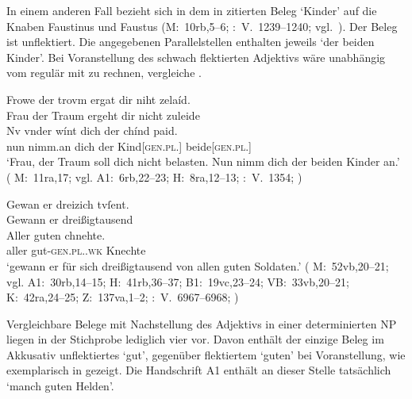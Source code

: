 In einem anderen Fall bezieht sich in dem in  zitierten
Beleg  `Kinder' auf die Knaben Faustinus und Faustus (M:~10rb,5--6;
\KC:~V.~1239--1240; vgl.~\cite[104]{schroeder1895}). Der Beleg ist unflektiert.
Die angegebenen Parallelstellen enthalten jeweils  `der beiden Kinder'. Bei Voranstellung des schwach flektierten
Adjektivs wäre unabhängig vom  regulär mit
 zu rechnen, vergleiche .

\begin{exe}
\ex \label{ex:chindpaid}
\begin{xlist}
	\ex \label{ex:chindpaid_1}
		\gll Frowe der trovm ergat dir niht zelaíd. \\
			Frau der Traum ergeht dir nicht zuleide \\
	\sn \gll Nv {vnder wínt} dich der chínd paid. \\
			nun nimm.an dich der Kind[\textsc{gen.pl.\NeutM}]
			beide[\textsc{gen.pl.\NeutM}] \\
		\trans `Frau, der Traum soll dich nicht belasten. Nun nimm dich der
			beiden Kinder an.'
			(%
				M:~11ra,17; vgl.
				A1:~6rb,22--23;
				H:~8ra,12--13;
				\KC:~V.~1354;
				\cite[106]{schroeder1895}%
			)

	\ex \label{ex:chindpaid_2}
		\gll Gewan er {dreizich tvſent}. \\
			Gewann er dreißigtausend \\
	\sn \gll Aller guten chnehte. \\
			aller gut-\textsc{gen.pl.\MascM.wk} Knechte \\
		\trans `gewann er  für sich dreißigtausend
			von allen guten Soldaten.'
			(%
				M:~52vb,20--21; vgl.
				A1:~30rb,14--15;
				H:~41rb,36--37;
				B1:~19vc,23--24;
				VB:~33vb,20--21;
				K:~42ra,24--25;
				Z:~137va,1--2;
				\KC:~V.~6967--6968;
				\cite[209]{schroeder1895}%
			)
\end{xlist}
\end{exe}

Vergleichbare Belege mit Nachstellung des Adjektivs in
einer determinierten NP liegen in der
Stichprobe lediglich vier vor. Davon enthält der einzige Beleg im Akkusativ
 unflektiertes  `gut', gegenüber flektiertem
 `guten' bei Voranstellung, wie exemplarisch in 
gezeigt. Die Handschrift A1 enthält an dieser Stelle %
tatsächlich  `manch guten Helden'.

